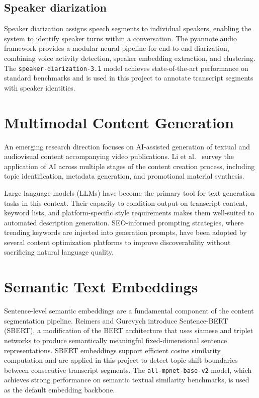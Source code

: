 \documentclass[ENG]{TFUOC}
\begin{document}
\subsection*{Speaker diarization}

Speaker diarization assigns speech segments to individual speakers, enabling the system to identify speaker turns within a conversation. The pyannote.audio framework \cite{bredin2021pyannote} provides a modular neural pipeline for end-to-end diarization, combining voice activity detection, speaker embedding extraction, and clustering. The \texttt{speaker-diarization-3.1} model achieves state-of-the-art performance on standard benchmarks and is used in this project to annotate transcript segments with speaker identities.

\section{Multimodal Content Generation}

An emerging research direction focuses on AI-assisted generation of textual and audiovisual content accompanying video publications. Li et al.\ \cite{ai_content_creation} survey the application of AI across multiple stages of the content creation process, including topic identification, metadata generation, and promotional material synthesis.

Large language models (LLMs) have become the primary tool for text generation tasks in this context. Their capacity to condition output on transcript content, keyword lists, and platform-specific style requirements makes them well-suited to automated description generation. SEO-informed prompting strategies, where trending keywords are injected into generation prompts, have been adopted by several content optimization platforms to improve discoverability without sacrificing natural language quality.

\section{Semantic Text Embeddings}

Sentence-level semantic embeddings are a fundamental component of the content segmentation pipeline. Reimers and Gurevych \cite{reimers2019sbert} introduce Sentence-BERT (SBERT), a modification of the BERT architecture that uses siamese and triplet networks to produce semantically meaningful fixed-dimensional sentence representations. SBERT embeddings support efficient cosine similarity computation and are applied in this project to detect topic shift boundaries between consecutive transcript segments. The \texttt{all-mpnet-base-v2} model, which achieves strong performance on semantic textual similarity benchmarks, is used as the default embedding backbone.
\end{document}
